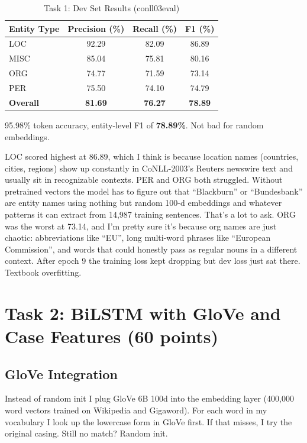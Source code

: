 \documentclass[11pt]{article}
\begin{document}
\begin{table}[h]
\centering
\caption{Task 1: Dev Set Results (conll03eval)}
\label{tab:res1}
\begin{tabular}{lccc}
\toprule
\textbf{Entity Type} & \textbf{Precision (\%)} & \textbf{Recall (\%)} & \textbf{F1 (\%)} \\
\midrule
LOC & 92.29 & 82.09 & 86.89 \\
MISC & 85.04 & 75.81 & 80.16 \\
ORG & 74.77 & 71.59 & 73.14 \\
PER & 75.50 & 74.10 & 74.79 \\
\midrule
\textbf{Overall} & \textbf{81.69} & \textbf{76.27} & \textbf{78.89} \\
\bottomrule
\end{tabular}
\end{table}

95.98\% token accuracy, entity-level F1 of \textbf{78.89\%}. Not bad for random embeddings.

LOC scored highest at 86.89, which I think is because location names (countries, cities, regions) show up constantly in CoNLL-2003's Reuters newswire text and usually sit in recognizable contexts. PER and ORG both struggled. Without pretrained vectors the model has to figure out that ``Blackburn'' or ``Bundesbank'' are entity names using nothing but random 100-d embeddings and whatever patterns it can extract from 14,987 training sentences. That's a lot to ask. ORG was the worst at 73.14, and I'm pretty sure it's because org names are just chaotic: abbreviations like ``EU'', long multi-word phrases like ``European Commission'', and words that could honestly pass as regular nouns in a different context. After epoch 9 the training loss kept dropping but dev loss just sat there. Textbook overfitting.

\section{Task 2: BiLSTM with GloVe and Case Features (60 points)}

\subsection{GloVe Integration}

Instead of random init I plug GloVe 6B 100d into the embedding layer (400,000 word vectors trained on Wikipedia and Gigaword). For each word in my vocabulary I look up the lowercase form in GloVe first. If that misses, I try the original casing. Still no match? Random init.
\end{document}
